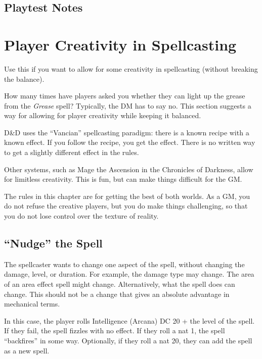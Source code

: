 \documentclass[twocolumn]{dndbook}
\begin{document}
\subsection{Playtest Notes}

\section{Player Creativity in Spellcasting}

\begin{emphasisParagraph}
	Use this if you want to allow for some creativity in spellcasting (without breaking the balance).
\end{emphasisParagraph}

\begin{emphasisParagraph}
	How many times have players asked you whether they can light up the grease from the \emph{Grease} spell?
	Typically, the DM has to say no. This section suggests a way for allowing for player creativity while keeping it balanced.
\end{emphasisParagraph}

D\&D uses the ``Vancian'' spellcasting paradigm: there is a known recipe with a known effect.
If you follow the recipe, you get the effect.
There is no written way to get a slightly different effect in the rules.\par

Other systems, such as Mage the Ascension in the Chronicles of Darkness, allow for limitless creativity.
This is fun, but can make things difficult for the GM.\par

The rules in this chapter are for getting the best of both worlds.
As a GM, you do not refuse the creative players, but you do make things challenging, so that you do not lose control over the texture of reality.

\subsection{``Nudge'' the Spell}

The spellcaster wants to change one aspect of the spell, without changing the damage, level, or duration.
For example, the damage type may change.
The area of an area effect spell might change.
Alternatively, what the spell does can change.
This should not be a change that gives an absolute advantage in mechanical terms.\par

In this case, the player rolls Intelligence (Arcana) DC 20 + the level of the spell.
If they fail, the spell fizzles with no effect.
If they roll a nat 1, the spell ``backfires'' in some way.
Optionally, if they roll a nat 20, they can add the spell as a new spell.
\end{document}
